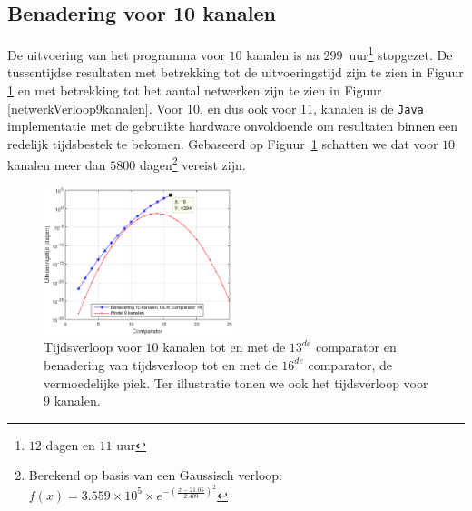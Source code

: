 \documentclass{article}
\begin{document}
\subsection{Benadering voor 10 kanalen}
De uitvoering van het programma voor $10$ kanalen is na $299$~uur\footnote{$12$ dagen en $11$ uur} stopgezet.
De tussentijdse resultaten met betrekking tot de uitvoeringstijd zijn te zien in Figuur \ref{tijdverloop10kanalen} en met betrekking tot het aantal netwerken zijn te zien in Figuur \ref{netwerkVerloop9kanalen}.
Voor 10, en dus ook voor 11, kanalen is de \texttt{Java} implementatie met de gebruikte hardware onvoldoende om resultaten binnen een redelijk tijdsbestek te bekomen.
Gebaseerd op Figuur~\ref{tijdverloop10kanalen} schatten we dat voor $10$ kanalen meer dan $5800$ dagen\footnote{Berekend op basis van een Gaussisch verloop: ${f(x) = 3.559\times10^{5}\times e^{-\left(\frac{x-21.05}{2.409}\right)^2}}$} vereist zijn. 
\begin{figure}[!h]
\centering
\includegraphics[width = 0.49\textwidth]{Benadering10_Gaussisch.png}
\caption{Tijdsverloop voor $10$ kanalen tot en met de  $13^{de}$ comparator en benadering van tijdsverloop tot en met de $16^{de}$ comparator, de vermoedelijke piek. Ter illustratie tonen we ook het tijdsverloop voor $9$ kanalen.}
\label{tijdverloop10kanalen}
\end{figure}
\end{document}
